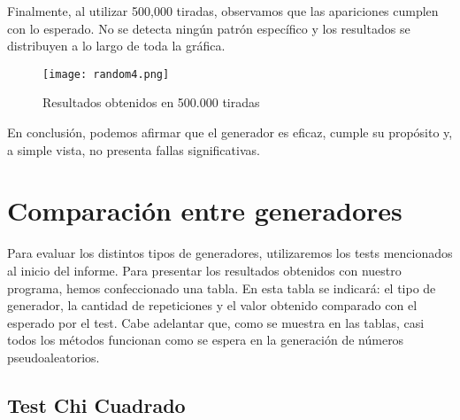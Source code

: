 \documentclass{article}
\begin{document}
Finalmente, al utilizar 500,000 tiradas, observamos que las apariciones cumplen con lo esperado. No se detecta ningún patrón específico y los resultados se distribuyen a lo largo de toda la gráfica.

\begin{figure}[H]
    \centering
    \texttt{[image: random4.png]}
    \caption{Resultados obtenidos en 500.000 tiradas}
    \label{fig:random-500000}
\end{figure}

En conclusión, podemos afirmar que el generador es eficaz, cumple su propósito y, a simple vista, no presenta fallas significativas.

\section{Comparación entre generadores}

Para evaluar los distintos tipos de generadores, utilizaremos los tests mencionados al inicio del informe. Para presentar los resultados obtenidos con nuestro programa, hemos confeccionado una tabla. En esta tabla se indicará: el tipo de generador, la cantidad de repeticiones y el valor obtenido comparado con el esperado por el test. Cabe adelantar que, como se muestra en las tablas, casi todos los métodos funcionan como se espera en la generación de números pseudoaleatorios.

\subsection{Test Chi Cuadrado}
\end{document}
